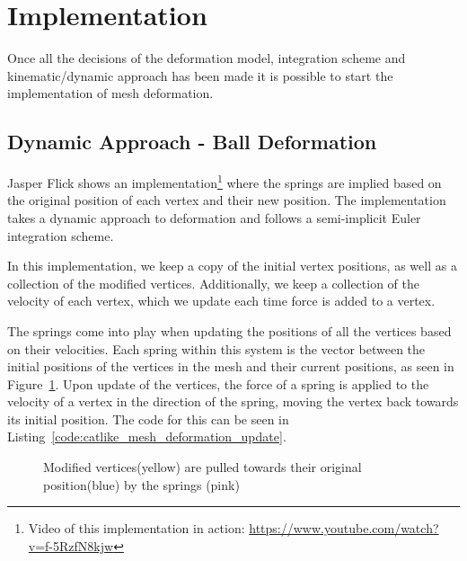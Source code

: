 \section{Implementation}
Once all the decisions of the deformation model, integration scheme and kinematic/dynamic approach has been made it is possible to start the implementation of mesh deformation.

\subsection{Dynamic Approach - Ball Deformation}
Jasper Flick\cite{catlike_mesh_deformation} shows an implementation\footnote{Video of this implementation in action: \url{https://www.youtube.com/watch?v=f-5RzfN8kjw}} where the springs are implied based on the original position of each vertex and their new position.
The implementation takes a dynamic approach to deformation and follows a semi-implicit Euler integration scheme.

In this implementation, we keep a copy of the initial vertex positions, as well as a collection of the modified vertices.
Additionally, we keep a collection of the velocity of each vertex, which we update each time force is added to a vertex.

The springs come into play when updating the positions of all the vertices based on their velocities.
Each spring within this system is the vector between the initial positions of the vertices in the mesh and their current positions, as seen in Figure~\ref{fig:catlike_mesh_deformation_springs}.
Upon update of the vertices, the force of a spring is applied to the velocity of a vertex in the direction of the spring, moving the vertex back towards its initial position.
The code for this can be seen in Listing~\ref{code:catlike_mesh_deformation_update}.

\begin{figure}
\centering
    \caption{Modified vertices(yellow) are pulled towards their original position(blue) by the springs (pink)\cite{catlike_mesh_deformation}}
    \label{fig:catlike_mesh_deformation_springs}
\end{figure}

